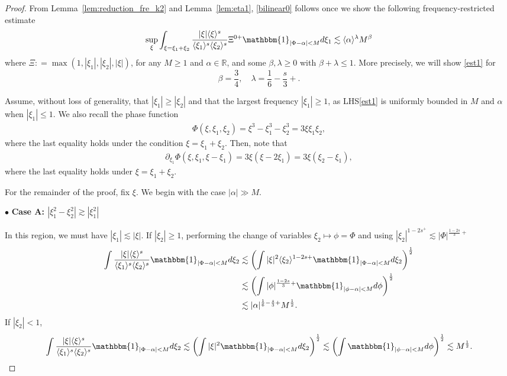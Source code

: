 \documentclass[%
11pt,  reqno]{amsart}
\newcommand{\fia}{\mathbbm{1}_{|\Phi-\alpha|<M}}
\newcommand{\jap}[1]{\langle #1 \rangle}
\newcommand{\5}{\textup{V}}
\newcommand{\noi}{\noindent}
\theoremstyle{remark}
\newcommand{\R}{\mathbb{R}}
\newcommand{\bul}{\bullet}
\newcommand{\al}{\alpha}
\newcommand{\be}{\beta}
\newcommand{\ld}{\lambda}
\numberwithin{equation}{section}
\numberwithin{theorem}{section}
\begin{document}
\begin{proof}%


From Lemma~\ref{lem:reduction_fre_k2} and Lemma~\ref{lem:eta1}, \eqref{bilinear0} follows once we show the following frequency-restricted estimate
\begin{equation}
\label{est1}
\sup_{\xi} \int_{\xi=\xi_1+\xi_2}
\frac{|\xi|\jap{\xi}^s}{\jap{\xi_1}^s\jap{\xi_2}^s}
\Xi^{0+}
\fia d\xi_1
\lesssim 
\jap{\al}^{\ld } M^{\be} 
\end{equation}
where $\Xi : = \max(1, |\xi_1|, |\xi_2|, |\xi|)$, 
for any $M\ge 1$ and $\al\in\R$, and some $\be,\ld \ge 0$ with $\be+\ld \le 1$. More precisely, we will show \eqref{est1} for
$$
\beta=\frac34,\quad \lambda=\frac{1}{6}-\frac s3+. 
$$


Assume, without loss of generality, that $|\xi_1|\ge |\xi_2|$ and that the largest frequency $|\xi_1| \ge 1$, as LHS\eqref{est1} is uniformly bounded in $M$ and $\al$ when $|\xi_1| \le 1$. We also recall the phase function 
\begin{align}
\label{phase2}
\Phi (\xi, \xi_1, \xi_2) = \xi^3 - \xi_1^3 - \xi_2^3 = 3 \xi \xi_1 \xi_2, 
\end{align}
where the last equality holds under the condition $\xi= \xi_1 + \xi_2$. Then, note that
\begin{align}
\label{phase2a}
\partial_{\xi_1} \Phi(\xi, \xi_1,\xi-\xi_1) 
= 
3 \xi (\xi -2 \xi_1)
= 
3 \xi(\xi_2 - \xi_1)
, 
\end{align}
where the last equality holds under $\xi = \xi_1+\xi_2$. 



For the remainder of the proof, fix $\xi$. We begin with the case $|\alpha|\gg M$.

\smallskip

\noi
$\bul$ 
\textbf{Case A: $|\xi_1^2-\xi_2^2| \gtrsim |\xi_1^2|$}

In this region, we must have $|\xi_1|\lesssim |\xi|$. If $|\xi_2|\ge 1$, performing the change of variables $\xi_2\mapsto \phi=\Phi$ and using $|\xi_2|^{1-2s^+}\lesssim |\Phi|^{\frac{1-2s}{3}+}$
\begin{align*}
     \int \frac{|\xi|\jap{\xi}^s}{\jap{\xi_1}^s\jap{\xi_2}^s}\fia d\xi_2 &\lesssim \left(\int |\xi|^2\jap{\xi_2}^{1-2s+}\fia d\xi_2\right)^\frac12\\&\lesssim \left(\int |\phi|^{\frac{1-2s}{3}+}\mathbbm{1}_{|\phi-\alpha|<M} d\phi\right)^\frac12\\&\lesssim |\alpha|^{\frac16 - \frac s3 +} M^{\frac12}.
\end{align*}
If $|\xi_2|<1$,
\begin{align*}
     \int \frac{|\xi|\jap{\xi}^s}{\jap{\xi_1}^s\jap{\xi_2}^s}\fia d\xi_2 \lesssim \left(\int |\xi|^2\fia d\xi_2\right)^\frac12\lesssim \left(\int \mathbbm{1}_{|\phi-\alpha|<M} d\phi\right)^\frac12\lesssim M^{\frac12}.
\end{align*}


\end{proof}
\end{document}
